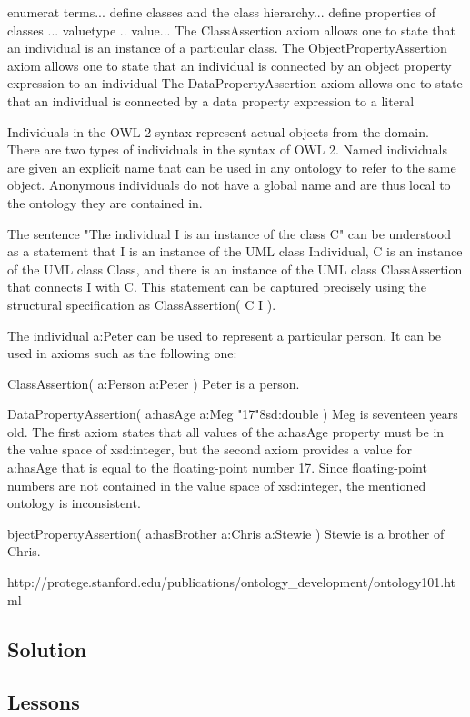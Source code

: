 \documentclass{sig-alternate}
\begin{document}
enumerat terms... define classes and the class hierarchy... define properties of classes ... valuetype .. value...
The ClassAssertion axiom allows one to state that an individual is an instance of a particular class.
The ObjectPropertyAssertion axiom allows one to state that an individual is connected by an object property expression to an individual
The DataPropertyAssertion axiom allows one to state that an individual is connected by a data property expression to a literal

Individuals in the OWL 2 syntax represent actual objects from the domain. There are two types of individuals in the syntax of OWL 2. Named individuals are given an explicit name that can be used in any ontology to refer to the same object. Anonymous individuals do not have a global name and are thus local to the ontology they are contained in.


The sentence "The individual I is an instance of the class C" can be understood as a statement that I is an instance of the UML class Individual, C is an instance of the UML class Class, and there is an instance of the UML class ClassAssertion that connects I with C. This statement can be captured precisely using the structural specification as ClassAssertion( C I ).

The individual a:Peter can be used to represent a particular person. It can be used in axioms such as the following one:

ClassAssertion( a:Person a:Peter )	Peter is a person.

DataPropertyAssertion( a:hasAge a:Meg "17"^^xsd:double )	Meg is seventeen years old.
The first axiom states that all values of the a:hasAge property must be in the value space of xsd:integer, but the second axiom provides a value for a:hasAge that is equal to the floating-point number 17. Since floating-point numbers are not contained in the value space of xsd:integer, the mentioned ontology is inconsistent.

bjectPropertyAssertion( a:hasBrother a:Chris a:Stewie )	Stewie is a brother of Chris.

http://protege.stanford.edu/publications/ontology_development/ontology101.html

\subsection{Solution}

\subsection{Lessons}
\end{document}
